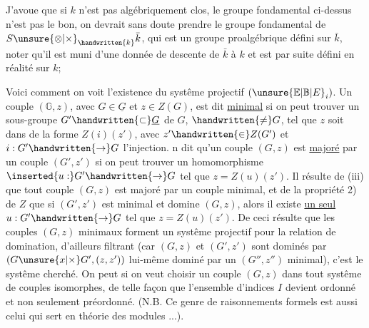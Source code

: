 J'avoue que si $k$ n'est pas algébriquement clos, le groupe fondamental ci-dessus n'est   pas le bon, on devrait sans doute prendre le groupe fondamental de $S\unsure{\otimes|\times}_{\handwritten{k}}\bar{k}$, qui est un groupe proalgébrique défini sur $\bar{k}$, noter qu'il est muni d'une donnée de descente de $\bar{k}$ à $k$ et est par suite défini en réalité sur $k$; 


Voici comment on voit l'existence du systême projectif $(\unsure{\mathbb{E}|\mathbb{B}|E}_i)$. Un couple $(\mathbb{G},z)$, avec $G\in\underline{G}$ et $z\in Z(G)$, est dit \uline{minimal} si on  peut trouver un sous-groupe $G'\handwritten{\subset}\underline{G}$ de $G$,  $\handwritten{\ne}G$, tel que $z$ soit dans de la forme $Z(i)(z')$, avec $z'\handwritten{\in}Z(G')$ et $i:G'\handwritten{\to}G$ l'injection.  n dit qu'un couple $(G,z)$ est \uline{majoré} par un couple $(G',z')$ si on peut trouver un homomorphisme $\inserted{u:}G'\handwritten{\to}G$ tel que $z=Z(u)(z')$. Il résulte de (iii) que tout couple $(G,z)$ est majoré par un couple minimal, et de la propriété 2) de $Z$ que si $(G',z')$ est minimal et domine $(G,z)$, alors il existe \uline{un seul} $u:G'\handwritten{\to}G$ tel que $z=Z(u)(z')$. De ceci résulte que les couples $(G,z)$ minimaux forment un systême projectif pour la relation de domination, d'ailleurs filtrant (car $(G,z)$ et $(G',z')$ sont dominés par $(G\unsure{x|\times}G',(z,z'))$ lui-même dominé par un $(G'',z'')$ minimal), c'est le systême cherché. On peut si on veut choisir un couple $(G,z)$ dans tout systême de couples  isomorphes, de  telle façon que l'ensemble d'indices  $I$ devient ordonné et non seulement préordonné. (N.B. Ce genre de raisonnements formels est aussi celui qui sert en théorie des  modules ...).

